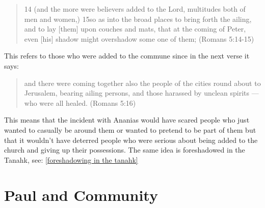 \documentclass[11pt]{article}
\begin{document}
\begin{quote}
14 (and the more were believers added to the Lord, multitudes both of men and women,) 15so as into the broad places to bring forth the ailing, and to lay [them] upon couches and mats, that at the coming of Peter, even [his] shadow might overshadow some one of them; (Romans 5:14-15)
\end{quote}
 This refers to those who were added to the commune since in the next verse it says: 
\begin{quote}
and there were coming together also the people of the cities round about to Jerusalem, bearing ailing persons, and those harassed by unclean spirits — who were all healed. (Romans 5:16)
\end{quote}
This means that the incident with Ananias would have scared people who just wanted to casually be around them or wanted to pretend to be part of them but that it wouldn't have deterred people who were serious about being added to the church and giving up their possessions. The same idea is foreshadowed in the Tanahk, see: \ref{foreshadowing in the tanahk}

\section{Paul and Community}
\end{document}
